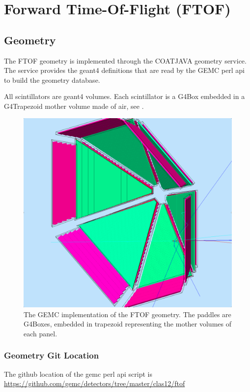 \section{Forward Time-Of-Flight (FTOF)}


\subsection{Geometry}

The FTOF geometry is implemented through the COATJAVA geometry service.
The service provides the geant4 definitions that are read by the GEMC perl api to build the geometry database.

All scintillators are geant4 volumes.
Each scintillator is a G4Box embedded in a G4Trapezoid mother volume made of air, see .

\begin{figure}
	\centering
	\includegraphics[width=0.95\columnwidth,keepaspectratio]{img/ftofGeometry.png}
	\caption{The GEMC implementation of the FTOF geometry. The paddles are G4Boxes, embedded in trapezoid representing the mother volumes of each panel.}
	\label{fig:ftofGeometry}
\end{figure}


\subsubsection{Geometry Git Location}
The github location of the gemc perl api script is \url{https://github.com/gemc/detectors/tree/master/clas12/ftof}

